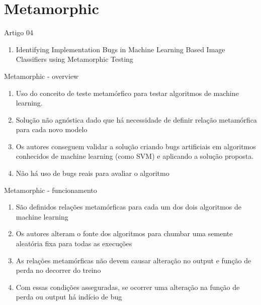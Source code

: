 \section{Metamorphic}

\begin{frame}
	\begin{block}{Artigo 04}
	\begin{enumerate}
		\item Identifying Implementation Bugs in Machine Learning Based Image Classifiers using Metamorphic Testing
	\end{enumerate}
	\end{block}
\end{frame}

\begin{frame}
	\begin{block}{Metamorphic - overview}
	\begin{enumerate}
		\item Uso do conceito de teste metamórfico para testar algoritmos de machine learning.
		\item Solução não agnóstica dado que há necessidade de definir relação metamórfica para cada novo modelo
		\item Os autores conseguem validar a solução criando bugs artificiais em algoritmos conhecidos de machine learning (como SVM) e aplicando a solução proposta.
		\item Não há uso de bugs reais para avaliar o algoritmo
	\end{enumerate}
	\end{block}
\end{frame}

\begin{frame}
	\begin{block}{Metamorphic - funcionamento}
		\begin{enumerate}
			\item São definidos relações metamórficas para cada um dos dois algoritmos de machine learning
			\item Os autores alteram o fonte dos algoritmos para chumbar uma semente aleatória fixa para todas as execuções
			\item As relações metamórficas não devem causar alteração no output e  função de perda no decorrer do treino
			\item Com essas condições asseguradas, se ocorrer uma alteração na função de perda ou output há indício de bug
		\end{enumerate}
	\end{block}
\end{frame}
